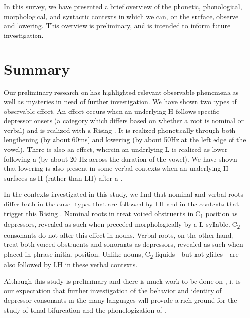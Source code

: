 \documentclass[output=paper
,newtxmath
,modfonts
,nonflat]{langsci/langscibook}
\begin{document}
In this survey, we have presented a brief overview of the phonetic, phonological, morphological, and syntactic contexts in which we can, on the surface, observe   and  lowering. This overview is preliminary, and is intended to inform future investigation.

\section{Summary}\label{sec:lotven:5}

Our preliminary research on  has highlighted relevant observable phenomena as well as mysteries in need of further investigation. We have shown two types of observable effect. An  effect occurs when an underlying H follows specific depressor onsets (a category which differs based on whether a root is nominal or verbal) and is realized with a Rising . It is realized phonetically through both lengthening (by about 60ms) and  lowering (by about 50Hz at the left edge of the vowel). There is also an   effect, wherein an underlying L is realized as lower following a  (by about 20 Hz across the duration of the vowel). We have shown that   lowering is also present in some verbal contexts when an underlying H surfaces as H (rather than LH) after a . 

In the contexts investigated in this study, we find that nominal and verbal roots differ both in the onset types that are followed by LH and in the contexts that trigger this Rising . Nominal roots in  treat voiced obstruents in C\textsubscript{1} position as depressors, revealed as such when preceded morphologically by a L  syllable. C\textsubscript{2} consonants do not alter this effect in nouns. Verbal roots, on the other hand, treat both voiced obstruents and sonorants as depressors, revealed as such when placed in phrase-initial position. Unlike nouns, C\textsubscript{2} liquids—but not glides—are also followed by LH in these verbal contexts. 

Although this study is preliminary and there is much work to be done on , it is our expectation that further investigation of the behavior and identity of depressor consonants in the many  languages will provide a rich ground for the study of tonal bifurcation and the phonologization of .
\end{document}
